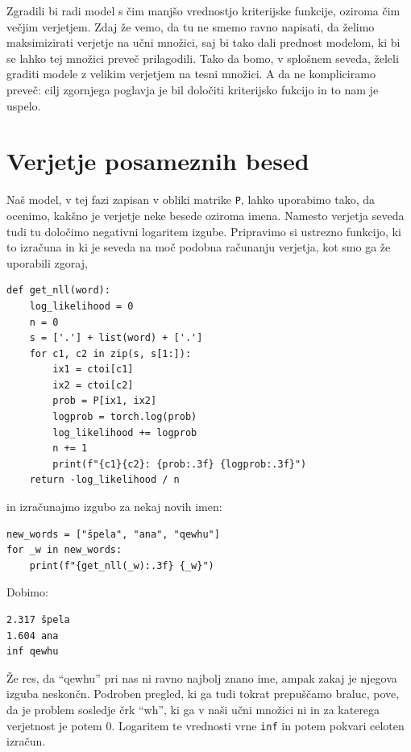 Zgradili bi radi model s čim manjšo vrednostjo kriterijske funkcije, oziroma čim večjim verjetjem. Zdaj že vemo, da tu ne smemo ravno napisati, da želimo maksimizirati verjetje na učni množici, saj bi tako dali prednost modelom, ki bi se lahko tej množici preveč prilagodili. Tako da bomo, v splošnem seveda, želeli graditi modele z velikim verjetjem na tesni množici. A da ne kompliciramo preveč: cilj zgornjega poglavja je bil določiti kriterijsko fukcijo in to nam je uspelo.

\section{Verjetje posameznih besed}

Naš model, v tej fazi zapisan v obliki matrike \texttt{P}, lahko uporabimo tako, da ocenimo, kakšno je verjetje neke besede oziroma imena. Namesto verjetja seveda tudi tu določimo negativni logaritem izgube. Pripravimo si ustrezno funkcijo, ki to izračuna in ki je seveda na moč podobna računanju verjetja, kot smo ga že uporabili zgoraj,
%
\vspace*{3mm}
\begin{lstlisting}
def get_nll(word):
    log_likelihood = 0
    n = 0
    s = ['.'] + list(word) + ['.']
    for c1, c2 in zip(s, s[1:]):
        ix1 = ctoi[c1]
        ix2 = ctoi[c2]
        prob = P[ix1, ix2]
        logprob = torch.log(prob)
        log_likelihood += logprob
        n += 1
        print(f"{c1}{c2}: {prob:.3f} {logprob:.3f}")
    return -log_likelihood / n
\end{lstlisting}
%
in izračunajmo izgubo za nekaj novih imen:
%
\vspace*{3mm}
\begin{lstlisting}
new_words = ["špela", "ana", "qewhu"]
for _w in new_words:
    print(f"{get_nll(_w):.3f} {_w}")
\end{lstlisting}
%
Dobimo:
%
\vspace*{3mm}
\begin{lstlisting}
2.317 špela
1.604 ana
inf qewhu
\end{lstlisting}
%
Že res, da ``qewhu'' pri nas ni ravno najbolj znano ime, ampak zakaj je njegova izguba neskončn. Podroben pregled, ki ga tudi tokrat prepuščamo braluc, pove, da je problem sosledje črk ``wh'', ki ga v naši učni množici ni in za katerega verjetnost je potem 0. Logaritem te vrednosti vrne \texttt{inf} in potem pokvari celoten izračun. 

